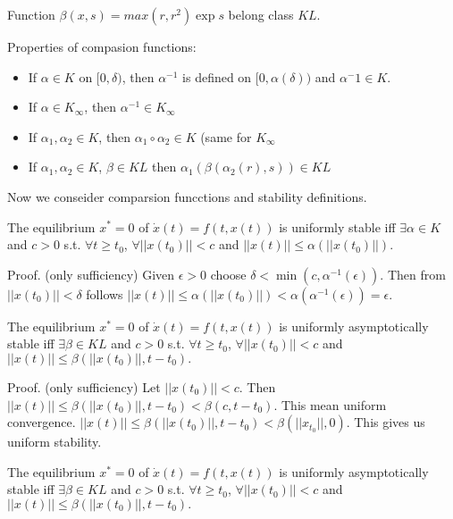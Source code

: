  Function $\beta(x,s)=max(r,r^2)\exp{s}$ belong class $KL$.

Properties of compasion functions:

\begin{itemize}
 \item If $\alpha \in K$ on $[0, \delta)$, then $\alpha^{-1}$ is defined on 
 $[0, \alpha(\delta))$ and $\alpha^-1 \in K$.
 \item If $\alpha \in K_\infty$, then $\alpha^{-1}\in K_\infty$
 \item If $\alpha_1,\alpha_2\in K$, then $\alpha_1 \circ \alpha_2\in K$
  (same for $K_\infty$
 \item If $\alpha_1,\alpha_2\in K$, $\beta\in KL $ then 
  $\alpha_1(\beta(\alpha_2(r),s)) \in KL$
\end{itemize}

Now we conseider comparsion funcctions and stability definitions.

 The equilibrium $x^*=0$ of $\dot x(t)=f(t,x(t))$ is uniformly stable iff
 $\exists \alpha\in K$ and $c>0$ s.t.  $\forall t \ge t_0$,
 $\forall ||x(t_0)||<c$ and $||x(t)|| \le \alpha(||x(t_0)||).$ 

 Proof. (only sufficiency) Given $\epsilon>0$ choose 
 $\delta<\min(c, \alpha^{-1}(\epsilon))$. Then from $||x(t_0)||<\delta$
 follows $||x(t)||\le\alpha(||x(t_0)||)<\alpha(\alpha^{-1}(\epsilon))=\epsilon$.


 The equilibrium $x^*=0$ of $\dot x(t)=f(t,x(t))$ is uniformly asymptotically stable iff
 $\exists \beta\in KL$ and $c>0$ s.t. $\forall t \ge t_0$,
 $\forall ||x(t_0)||<c$ and $||x(t)|| \le \beta(||x(t_0)||, t-t_0).$ 

 Proof. (only sufficiency) Let $||x(t_0)||<c$. Then 
 $||x(t)|| \le \beta(||x(t_0)||, t-t_0) < \beta(c,t-t_0)$. This mean uniform convergence.
 $||x(t)||\le\beta(||x(t_0)||, t-t_0)<\beta(||x_t_0||, 0)$. This gives us uniform
 stability.


 The equilibrium $x^*=0$ of $\dot x(t)=f(t,x(t))$ is uniformly asymptotically stable iff
 $\exists \beta\in KL$ and $c>0$ s.t. $\forall t \ge t_0$,
 $\forall ||x(t_0)||<c$ and $||x(t)|| \le \beta(||x(t_0)||, t-t_0).$ 

